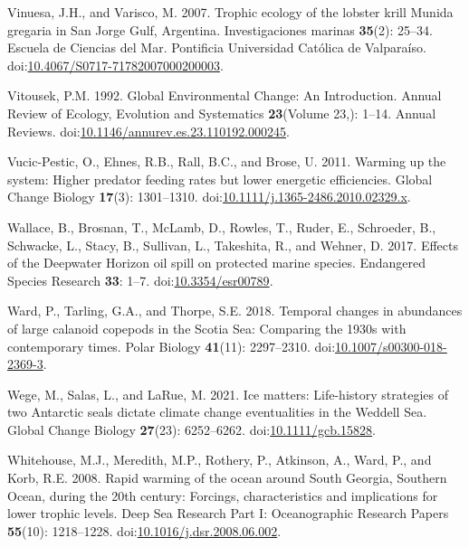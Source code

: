 \documentclass[
]{article}
\newlength{\cslhangindent}
\newenvironment{CSLReferences}[2] %
 {\begin{list}{}{%
  \setlength{\itemindent}{0pt}
  \setlength{\leftmargin}{0pt}
  \setlength{\parsep}{0pt}
  \ifodd #1
   \setlength{\leftmargin}{\cslhangindent}
   \setlength{\itemindent}{-1\cslhangindent}
  \fi
  \setlength{\itemsep}{#2\baselineskip}}}
 {\end{list}}
\begin{document}
\begin{CSLReferences}{1}{0}
Vinuesa, J.H., and Varisco, M. 2007. Trophic ecology of the lobster
krill {Munida} gregaria in {San Jorge Gulf}, {Argentina}.
Investigaciones marinas \textbf{35}(2): 25--34. Escuela de Ciencias del
Mar. Pontificia Universidad Cat{ó}lica de Valpara{í}so.
doi:\href{https://doi.org/10.4067/S0717-71782007000200003}{10.4067/S0717-71782007000200003}.

Vitousek, P.M. 1992. Global {Environmental Change}: {An Introduction}.
Annual Review of Ecology, Evolution and Systematics \textbf{23}(Volume
23,): 1--14. Annual Reviews.
doi:\href{https://doi.org/10.1146/annurev.es.23.110192.000245}{10.1146/annurev.es.23.110192.000245}.

Vucic-Pestic, O., Ehnes, R.B., Rall, B.C., and Brose, U. 2011. Warming
up the system: Higher predator feeding rates but lower energetic
efficiencies. Global Change Biology \textbf{17}(3): 1301--1310.
doi:\href{https://doi.org/10.1111/j.1365-2486.2010.02329.x}{10.1111/j.1365-2486.2010.02329.x}.

Wallace, B., Brosnan, T., McLamb, D., Rowles, T., Ruder, E., Schroeder,
B., Schwacke, L., Stacy, B., Sullivan, L., Takeshita, R., and Wehner, D.
2017. Effects of the {Deepwater Horizon} oil spill on protected marine
species. Endangered Species Research \textbf{33}: 1--7.
doi:\href{https://doi.org/10.3354/esr00789}{10.3354/esr00789}.

Ward, P., Tarling, G.A., and Thorpe, S.E. 2018. Temporal changes in
abundances of large calanoid copepods in the {Scotia Sea}: Comparing the
1930s with contemporary times. Polar Biology \textbf{41}(11):
2297--2310.
doi:\href{https://doi.org/10.1007/s00300-018-2369-3}{10.1007/s00300-018-2369-3}.

Wege, M., Salas, L., and LaRue, M. 2021. Ice matters: {Life-history}
strategies of two {Antarctic} seals dictate climate change eventualities
in the {Weddell Sea}. Global Change Biology \textbf{27}(23): 6252--6262.
doi:\href{https://doi.org/10.1111/gcb.15828}{10.1111/gcb.15828}.

Whitehouse, M.J., Meredith, M.P., Rothery, P., Atkinson, A., Ward, P.,
and Korb, R.E. 2008. Rapid warming of the ocean around {South Georgia},
{Southern Ocean}, during the 20th century: {Forcings}, characteristics
and implications for lower trophic levels. Deep Sea Research Part I:
Oceanographic Research Papers \textbf{55}(10): 1218--1228.
doi:\href{https://doi.org/10.1016/j.dsr.2008.06.002}{10.1016/j.dsr.2008.06.002}.


\end{CSLReferences}
\end{document}
